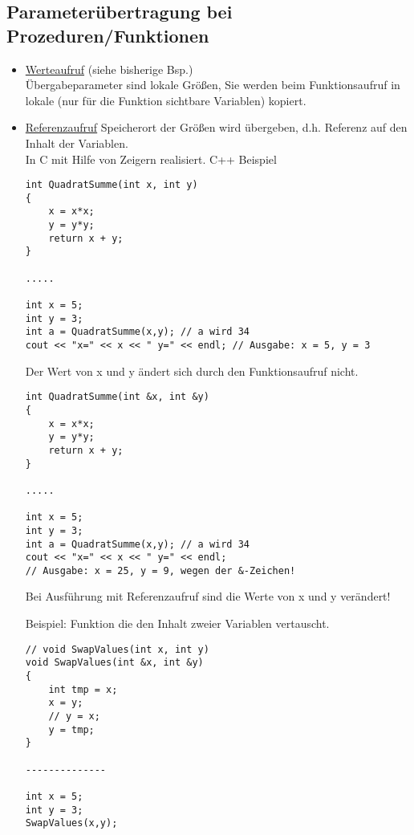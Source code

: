 \subsection{Parameterübertragung bei Prozeduren/Funktionen}
\begin{itemize}
\item \underline{Werteaufruf} (siehe bisherige Bsp.) \\
Übergabeparameter sind lokale Größen, Sie werden beim Funktionsaufruf in lokale (nur für die Funktion sichtbare Variablen) kopiert.
\item \underline{Referenzaufruf} Speicherort der Größen wird übergeben, d.h. Referenz auf den Inhalt der Variablen. \\
In C mit Hilfe von Zeigern realisiert.
C++ Beispiel
\begin{lstlisting}
int QuadratSumme(int x, int y)
{
	x = x*x;
	y = y*y;
	return x + y;
}

.....

int x = 5;
int y = 3;
int a = QuadratSumme(x,y); // a wird 34
cout << "x=" << x << " y=" << endl; // Ausgabe: x = 5, y = 3

\end{lstlisting}
Der Wert von x und y ändert sich durch den Funktionsaufruf nicht.
\begin{lstlisting}
int QuadratSumme(int &x, int &y)
{
	x = x*x;
	y = y*y;
	return x + y;
}

.....

int x = 5;
int y = 3;
int a = QuadratSumme(x,y); // a wird 34
cout << "x=" << x << " y=" << endl;
// Ausgabe: x = 25, y = 9, wegen der &-Zeichen!
\end{lstlisting}
Bei Ausführung mit Referenzaufruf sind die Werte von x und y verändert!

Beispiel: Funktion die den Inhalt zweier Variablen vertauscht.
\begin{lstlisting}
// void SwapValues(int x, int y)
void SwapValues(int &x, int &y)
{
	int tmp = x;
	x = y;
	// y = x;
	y = tmp;
}

--------------

int x = 5;
int y = 3;
SwapValues(x,y);
\end{lstlisting}
\end{itemize}

